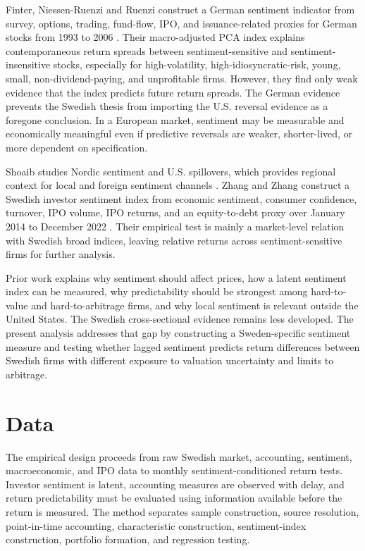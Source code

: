 \documentclass[11pt]{article}
\begin{document}
Finter, Niessen-Ruenzi and Ruenzi construct a German sentiment indicator from survey, options, trading, fund-flow, IPO, and issuance-related proxies for German stocks from 1993 to 2006 \citep{finter2012german}. Their macro-adjusted PCA index explains contemporaneous return spreads between sentiment-sensitive and sentiment-insensitive stocks, especially for high-volatility, high-idiosyncratic-risk, young, small, non-dividend-paying, and unprofitable firms. However, they find only weak evidence that the index predicts future return spreads. The German evidence prevents the Swedish thesis from importing the U.S. reversal evidence as a foregone conclusion. In a European market, sentiment may be measurable and economically meaningful even if predictive reversals are weaker, shorter-lived, or more dependent on specification.

Shoaib studies Nordic sentiment and U.S. spillovers, which provides regional context for local and foreign sentiment channels \citep{shoaib2019nordic}. Zhang and Zhang construct a Swedish investor sentiment index from economic sentiment, consumer confidence, turnover, IPO volume, IPO returns, and an equity-to-debt proxy over January 2014 to December 2022 \citep{zhang2023sweden}. Their empirical test is mainly a market-level relation with Swedish broad indices, leaving relative returns across sentiment-sensitive firms for further analysis.

Prior work explains why sentiment should affect prices, how a latent sentiment index can be measured, why predictability should be strongest among hard-to-value and hard-to-arbitrage firms, and why local sentiment is relevant outside the United States. The Swedish cross-sectional evidence remains less developed. The present analysis addresses that gap by constructing a Sweden-specific sentiment measure and testing whether lagged sentiment predicts return differences between Swedish firms with different exposure to valuation uncertainty and limits to arbitrage.

\section{Data}
The empirical design proceeds from raw Swedish market, accounting, sentiment, macroeconomic, and IPO data to monthly sentiment-conditioned return tests. Investor sentiment is latent, accounting measures are observed with delay, and return predictability must be evaluated using information available before the return is measured. The method separates sample construction, source resolution, point-in-time accounting, characteristic construction, sentiment-index construction, portfolio formation, and regression testing.
\end{document}
